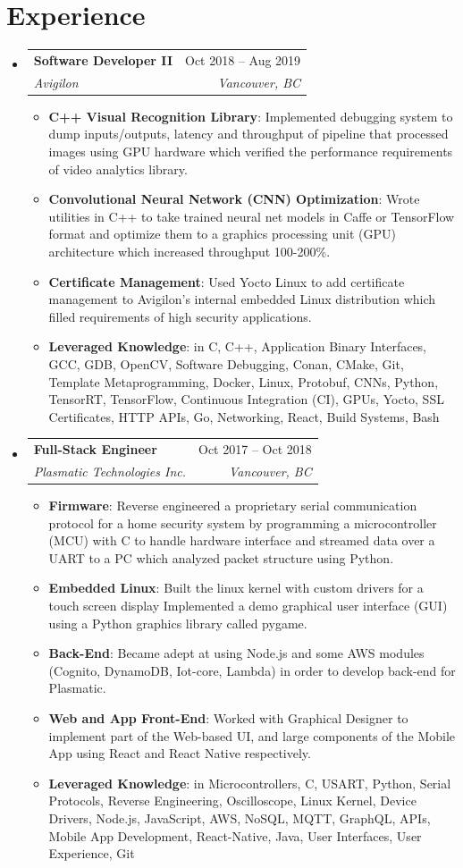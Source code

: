 \documentclass[letterpaper,10pt]{article}
\makeatletter
\newcommand{\resumeItem}[2]{
    \item\small{
    \textbf{#1}{: #2 \vspace{-2pt}}
  }
}
\newcommand{\ResumeSubheading}[4]{
  \vspace{-1pt}\item
    \begin{tabular*}{\textwidth}[t]{l@{\extracolsep{\fill}}r}
      \textbf{#1} & #2 \\
      \textit{\small#3} & \textit{\small #4} \\
    \end{tabular*}
  \vspace{-5pt}
}
\newenvironment{SubheadingList}
  {\begin{itemize}[label=,leftmargin=0em]}
  {\end{itemize}}
\newenvironment{ItemList}
  {\begin{itemize}[label=,leftmargin=1em]}
  {\end{itemize}\vspace{-5pt}}
\makeatother
\begin{document}
\section{Experience}
\begin{SubheadingList}
  \ResumeSubheading
    {Software Developer II}{Oct 2018 -- Aug 2019}
    {Avigilon}{Vancouver, BC}
  \begin{ItemList}
    \resumeItem{C++ Visual Recognition Library}
      {Implemented debugging system to dump inputs/outputs, latency and
      throughput of pipeline that processed images using GPU hardware which
      verified the performance requirements of video analytics library.}
    \resumeItem{Convolutional Neural Network (CNN) Optimization}
      {Wrote utilities in C++ to take trained neural net models in Caffe or
      TensorFlow format and optimize them to a graphics processing unit (GPU)
      architecture which increased throughput 100-200\%.}
    \resumeItem{Certificate Management}
      {Used Yocto Linux to add certificate management to Avigilon's internal
      embedded Linux distribution which filled requirements of high security
      applications.}
    \resumeItem{Leveraged Knowledge}{in C, C++, Application Binary Interfaces,
    GCC, GDB, OpenCV, Software Debugging, Conan, CMake, Git, Template
    Metaprogramming, Docker, Linux, Protobuf, CNNs, Python, TensorRT,
    TensorFlow, Continuous Integration (CI), GPUs, Yocto, SSL Certificates, HTTP
    APIs, Go, Networking, React, Build Systems, Bash}
  \end{ItemList}

  \ResumeSubheading
    {Full-Stack Engineer}{Oct 2017 -- Oct 2018}
    {Plasmatic Technologies Inc.}{Vancouver, BC}
  \begin{ItemList}
    \resumeItem{Firmware}
      {Reverse engineered a proprietary serial communication protocol
      for a home security system by programming a microcontroller (MCU) with C to
      handle hardware interface and streamed data over a UART to a PC
      which analyzed packet structure using Python.}
    \resumeItem{Embedded Linux}
      {Built the linux kernel with custom drivers for a touch screen display
      Implemented a demo graphical user interface (GUI) using a Python graphics
      library called pygame.}
    \resumeItem{Back-End}
      {Became adept at using Node.js and some AWS modules (Cognito, DynamoDB,
      Iot-core, Lambda) in order to develop back-end for Plasmatic.}
    \resumeItem{Web and App Front-End}
      {Worked with Graphical Designer to implement part of the Web-based UI, and
      large components of the Mobile App using React and React Native
      respectively.}
    \resumeItem{Leveraged Knowledge}
    {in Microcontrollers, C, USART, Python, Serial Protocols, Reverse
    Engineering, Oscilloscope, Linux Kernel, Device Drivers, Node.js,
    JavaScript, AWS, NoSQL, MQTT, GraphQL, APIs, Mobile App Development,
    React-Native, Java, User Interfaces, User Experience, Git}
  \end{ItemList}


\end{SubheadingList}
\end{document}

